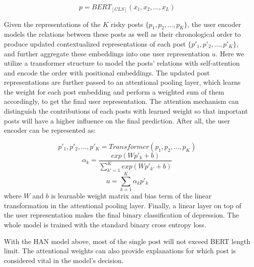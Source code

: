 \begin{equation}
    p = BERT_{[CLS]}(x_1, x_2, ..., x_L)
\end{equation}

Given the representations of the $K$ risky posts $\{p_1, p_2, ..., p_K\}$, the user encoder models the relations between these posts as well as their chronological order to produce updated contextualized representations of each post $\{p'_1, p'_2, ..., p'_K\}$, and further aggregate these embeddings into one user representation $u$. Here we utilize a transformer structure to model the posts' relations with self-attention and encode the order with positional embeddings. The updated post representations are further passed to an attentional pooling layer, which learns the weight for each post embedding and perform a weighted sum of them accordingly, to get the final user representation. The attention mechanism can distinguish the contributions of each posts with learned weight so that important posts will have a higher influence on the final prediction. After all, the user encoder can be represented as:

\begin{equation}
    p'_1, p'_2, ..., p'_K = Transformer(p_1, p_2, ..., p_K)
\end{equation}
\begin{equation}
    \alpha_k = \frac{exp(W p'_k + b)}{\sum_{k'=1}^{K} exp(W p'_{k'} + b)}
\end{equation}
\begin{equation}
    u = \sum_{k=1}^K \alpha_k p'_k
\end{equation}
where $W$ and $b$ is learnable weight matrix and bias term of the linear transformation in the attentional pooling layer. Finally, a linear layer on top of the user representation makes the final binary classification of depression. The whole model is trained with the standard binary cross entropy loss.

With the HAN model above, most of the single post will not exceed BERT length limit.  The attentional weights can also provide explanations for which post is considered vital in the model's decision. %

